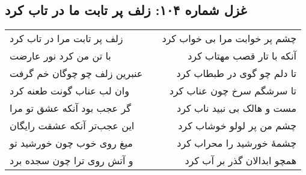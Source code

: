 \begin{center}
\section*{غزل شماره ۱۰۴: زلف پر تابت ما در تاب کرد}
\label{sec:104}
\begin{longtable}{l p{0.5cm} r}
زلف پر تابت مرا در تاب کرد
&&
چشم پر خوابت مرا بی خواب کرد
\\
با تن من کرد نور عارضت
&&
آنکه با تار قصب مهتاب کرد
\\
عنبرین زلف چو چوگان خم گرفت
&&
تا دلم چو گوی در طبطاب کرد
\\
وان لب عناب گونت طعنه کرد
&&
تا سرشگم سرخ چون عناب کرد
\\
گر عجب بود آنکه عشق تو مرا
&&
مست و هالک بی نبید ناب کرد
\\
این عجب‌تر آنکه عشقت رایگان
&&
چشم من پر لولو خوشاب کرد
\\
میغ روی خوب چون خورشید تو
&&
چشمهٔ خورشید را محراب کرد
\\
و آتش روی ترا چون سجده برد
&&
همچو ابدالان گذر بر آب کرد
\\
\end{longtable}
\end{center}
